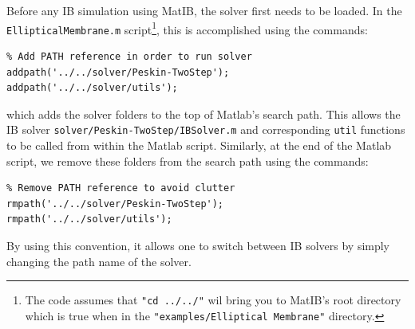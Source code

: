 \documentclass{article}
\newcommand{\mycode}[1]{\texttt{#1}}
\begin{document}
Before any IB simulation using MatIB, the solver first needs to be loaded. 
In the \mycode{EllipticalMembrane.m} script\footnote{The code assumes that \mycode{"cd ../../"} wil bring you to MatIB's root directory 
which is true when in the \mycode{"examples/Elliptical Membrane"} directory.}, this is accomplished using the commands:
\begin{lstlisting}
% Add PATH reference in order to run solver
addpath('../../solver/Peskin-TwoStep');
addpath('../../solver/utils');
\end{lstlisting}
which adds the solver folders to the top of Matlab's search path.
This allows the IB solver \mycode{solver/Peskin-TwoStep/IBSolver.m} and corresponding \mycode{util} functions to be called 
from within the Matlab script. Similarly, at the end of the Matlab script, we remove these folders from the search path 
using the commands:
\begin{lstlisting}
% Remove PATH reference to avoid clutter
rmpath('../../solver/Peskin-TwoStep');
rmpath('../../solver/utils');
\end{lstlisting}
By using this convention, it allows one to switch between IB solvers by simply changing the path name of the solver.
\end{document}
